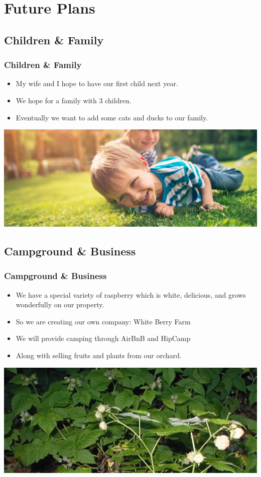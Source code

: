 \documentclass{beamer}
\begin{document}
	\section{Future Plans}
	
\subsection{Children \& Family}
\begin{frame}
	\frametitle{Children \& Family}
	\begin{itemize}
		\item My wife and I hope to have our first child next year.
		\item We hope for a family with 3 children.  
		\item Eventually we want to add some cats and ducks to our family.  
	\end{itemize}
	\begin{center}
		\includegraphics[width = 1.0\textwidth]{images/kids.jpg}
	\end{center}
\end{frame}

\subsection{Campground \& Business}
\begin{frame}
	\frametitle{Campground \& Business}
	\begin{itemize}
		\item We have a special variety of raspberry which is white, delicious, and grows wonderfully on our property.
		\item So we are creating our own company:  White Berry Farm
		\item We will provide camping through AirBnB and HipCamp
		\item Along with selling fruits and plants from our orchard.
	\end{itemize}
	\begin{center}
		\includegraphics[width = 1.0\textwidth]{images/white raspberry.png}
	\end{center}
\end{frame}
\end{document}
